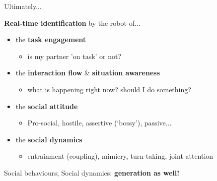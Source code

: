 \documentclass[xcolor=table]{beamer}
\begin{document}
\begin{frame}{Ultimately...}

    {\bf Real-time identification} by the robot of...

    \begin{itemize}
        \item<+-> the \textbf{task engagement}
            \begin{itemize}
                \item is my partner 'on task' or not?
            \end{itemize}
        \item<+-> the \textbf{interaction flow} \& \textbf{situation awareness}
            \begin{itemize}
                \item what is happening right now? should I do something?
            \end{itemize}
        \item<+-> the \textbf{social attitude}
            \begin{itemize}
                \item Pro-social, hostile, assertive (‘bossy’), passive...
            \end{itemize}
        \item<+-> the \textbf{social dynamics}
            \begin{itemize}
                \item entrainment (coupling), mimicry, turn-taking, joint
                    attention
            \end{itemize}
    \end{itemize}

    \pause

    Social behaviours; Social dynamics: \textbf{generation as well!}
\end{frame}

\end{document}
